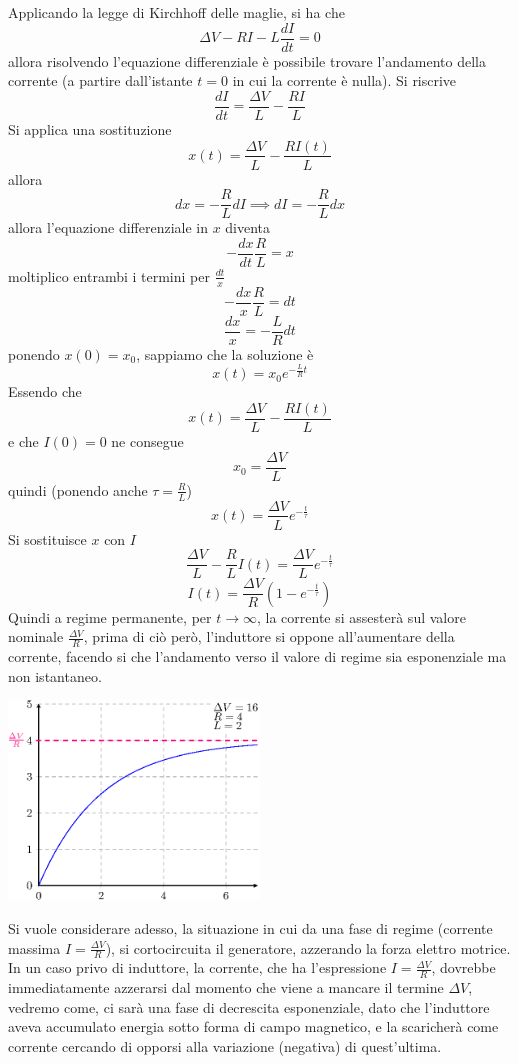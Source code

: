 \documentclass[10pt, letterpaper]{report}
\begin{document}
Applicando la legge di Kirchhoff delle maglie, si ha che 
$$ \Delta V - RI - L\frac{dI}{dt}=0$$
allora risolvendo l'equazione differenziale è possibile trovare l'andamento della corrente (a partire dall'istante $t=0$ in cui la corrente è nulla). Si riscrive 
$$ \frac{dI}{dt}=\frac{\Delta V}{L}-\frac{RI}{L}$$
Si applica una sostituzione 
$$ x(t)=\frac{\Delta V}{L}-\frac{RI(t)}{L}$$
allora 
$$ dx=-\frac{R}{L}dI\implies dI=-\frac{R}{L}dx$$
allora l'equazione differenziale in $x$ diventa  
$$ -\frac{dx}{dt}\frac{R}{L}=x $$
moltiplico entrambi i termini per $\frac{dt}{x}$
$$ -\frac{dx}{x}\frac{R}{L}=dt  $$
$$ \frac{dx}{x}=-\frac{L}{R}dt  $$
ponendo $x(0)=x_0$, sappiamo che la soluzione è 
$$ x(t)=x_0e^{-\frac{L}{R}t}$$
Essendo che
$$ x(t)=\frac{\Delta V}{L}-\frac{RI(t)}{L}$$
e che $I(0)=0$ ne consegue 
$$x_0=\frac{\Delta V}{L}$$
quindi (ponendo anche $\tau = \frac{R}{L}$)
$$ x(t)=\frac{\Delta V}{L}e^{-\frac{t}{\tau}}$$
Si sostituisce $x$ con $I$
$$ \frac{\Delta V}{L}-\frac{R}{L}I(t)=\frac{\Delta V}{L}e^{-\frac{t}{\tau}}$$
$$ I(t)=\frac{\Delta V}{R}(1-e^{-\frac{t}{\tau}})$$
Quindi a regime permanente, per $t\rightarrow \infty$, la corrente si assesterà sul valore nominale $\frac{\Delta V}{R}$, prima di ciò però, l'induttore si oppone all'aumentare della corrente, facendo si che l'andamento verso il valore di regime sia esponenziale ma non istantaneo.\begin{center}
    \includegraphics[width=0.5\textwidth]{images/correnteRL.eps}
\end{center}
Si vuole considerare adesso, la situazione in cui da una fase di regime (corrente massima $I=\frac{\Delta V}{R}$), si cortocircuita il generatore, azzerando la forza elettro motrice.\acc 
In un caso privo di induttore, la corrente, che ha l'espressione $I=\frac{\Delta V}{R}$, dovrebbe immediatamente azzerarsi dal momento che viene a mancare il termine $\Delta V$, vedremo come, ci sarà una fase di decrescita esponenziale, dato che l'induttore aveva accumulato energia sotto forma di campo magnetico, e la scaricherà come corrente cercando di opporsi alla variazione (negativa) di quest'ultima.\acc 
\end{document}
